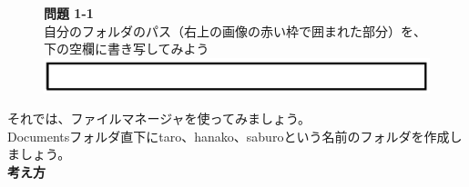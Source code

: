 \documentclass[a4paper,12pt]{jarticle}
\begin{document}
\begin{figure}[ht]
{\bfseries
問題 1-1}\\
自分のフォルダのパス（右上の画像の赤い枠で囲まれた部分）を、下の空欄に書き写してみよう
\includegraphics[width=17cm]{textbook-img1021.png}

\vspace{20pt}
\end{figure}
\clearpage

それでは、ファイルマネージャを使ってみましょう。\\Documentsフォルダ直下にtaro、hanako、saburoという名前のフォルダを作成しましょう。\\

{\bf \large 考え方}
\vfill
\end{document}
